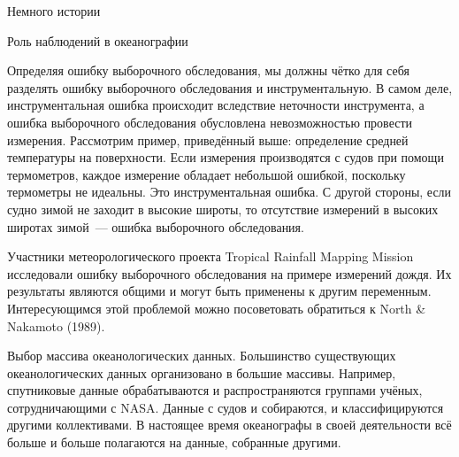 \begin{chapter}{Немного истории}
\begin{section}{Роль наблюдений в океанографии}
{{Определяя ошибку выборочного обследования, мы должны чётко для себя разделять 
ошибку выборочного обследования и инструментальную. В самом деле,
инструментальная ошибка происходит вследствие неточности инструмента,
а ошибка выборочного обследования обусловлена невозможностью провести 
измерения. Рассмотрим пример, приведённый выше: определение средней температуры 
на поверхности. Если измерения производятся с судов при помощи термометров, 
каждое измерение обладает небольшой ошибкой, поскольку термометры не идеальны. 
Это инструментальная ошибка. С другой стороны, если судно зимой не заходит 
в высокие широты, то отсутствие  измерений в высоких широтах зимой~--- ошибка 
выборочного обследования.
%

Участники метеорологического проекта Tropical Rainfall Mapping Mission 
исследовали ошибку выборочного обследования на примере измерений дождя. 
Их результаты являются общими и могут быть применены к другим переменным. 
Интересующимся этой проблемой можно посоветовать обратиться к North \& Nakamoto (1989).
%
}%
}

\begin{paragraph}{Выбор массива океанологических данных.}
Большинство существующих
океанологических данных организовано в большие массивы.
Например, спутниковые данные обрабатываются и распространяются
группами учёных, сотрудничающими с NASA. Данные с судов и собираются, и
классифицируются другими коллективами. В настоящее время океанографы в своей 
деятельности всё больше и больше полагаются на данные, собранные другими.
%



\end{paragraph}
\end{section}
\end{chapter}
